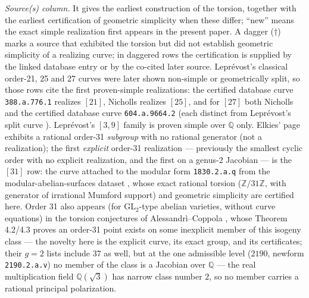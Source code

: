 \documentclass[11pt]{amsart}
\begin{document}
\emph{Source(s) column.} It gives the earliest construction of the torsion,
together with the earliest certification of geometric simplicity when these
differ; ``new'' means the exact simple realization first appears in the present
paper.  A dagger ($\dagger$) marks a source that exhibited the torsion but did
not establish geometric simplicity of a realizing curve; in daggered rows the
certification is supplied by the linked database entry or by the co-cited later
source.  Lepr\'evost's classical order-21, 25 and 27 curves were later shown
non-simple or geometrically split, so those rows cite the first proven-simple
realizations: the certified database curve \texttt{388.a.776.1} realizes $[21]$,
Nicholls \cite{Nicholls2018} realizes $[25]$, and for $[27]$ both Nicholls
\cite{Nicholls2018} and the certified database curve \texttt{604.a.9664.2}
(each distinct from Lepr\'evost's split curve \cite{Leprevost1995}).
Lepr\'evost's $[3,9]$ family is proven
simple over $\mathbb{Q}$ only.  Elkies' page exhibits a rational order-31
\emph{subgroup} with no rational generator (not a realization); the first
\emph{explicit} order-31 realization --- previously the smallest cyclic order
with no explicit realization, and the first on a genus-2 Jacobian --- is the
$[31]$ row: the curve attached to the modular form
\texttt{1830.2.a.q} from the modular-abelian-surfaces dataset \cite{CEHJMPV},
whose exact rational torsion ($\mathbb{Z}/31\mathbb{Z}$, with generator of
irrational Mumford support) and geometric simplicity are certified here.
Order 31 also appears (for $\mathrm{GL}_2$-type abelian varieties, without
curve equations) in the torsion conjectures of Alessandr\`i--Coppola
\cite{AC2026}, whose Theorem 4.2/4.3 proves an order-31 point exists on some
inexplicit member of this isogeny class --- the novelty here is the explicit
curve, its exact group, and its certificates; their $g=2$ lists include 37 as
well, but at the one
admissible level ($2190$, newform \texttt{2190.2.a.v}) no member of the class
is a Jacobian over $\mathbb{Q}$ --- the real multiplication field
$\mathbb{Q}(\sqrt3)$ has narrow class number $2$, so no member carries a
rational principal polarization.
\end{document}
